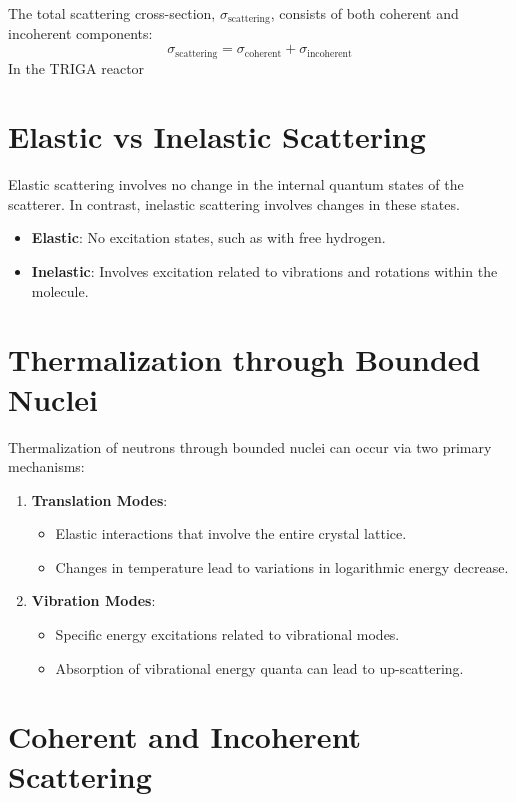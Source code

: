 The total scattering cross-section, $\sigma_{\text{scattering}}$, consists of both coherent and incoherent components:
\begin{equation}
    \sigma_{\text{scattering}} = \sigma_{\text{coherent}} + \sigma_{\text{incoherent}}
\end{equation}
In the TRIGA reactor
\section{Elastic vs Inelastic Scattering}

Elastic scattering involves no change in the internal quantum states of the scatterer. In contrast, inelastic scattering involves changes in these states.

\begin{itemize}
    \item \textbf{Elastic}: No excitation states, such as with free hydrogen.
    \item \textbf{Inelastic}: Involves excitation related to vibrations and rotations within the molecule.
\end{itemize}

\section{Thermalization through Bounded Nuclei}

Thermalization of neutrons through bounded nuclei can occur via two primary mechanisms:
\begin{enumerate}
    \item \textbf{Translation Modes}:
        \begin{itemize}
            \item Elastic interactions that involve the entire crystal lattice.
            \item Changes in temperature lead to variations in logarithmic energy decrease.
        \end{itemize}
    \item \textbf{Vibration Modes}:
        \begin{itemize}
            \item Specific energy excitations related to vibrational modes.
            \item Absorption of vibrational energy quanta can lead to up-scattering.
        \end{itemize}
\end{enumerate}

\section{Coherent and Incoherent Scattering}

